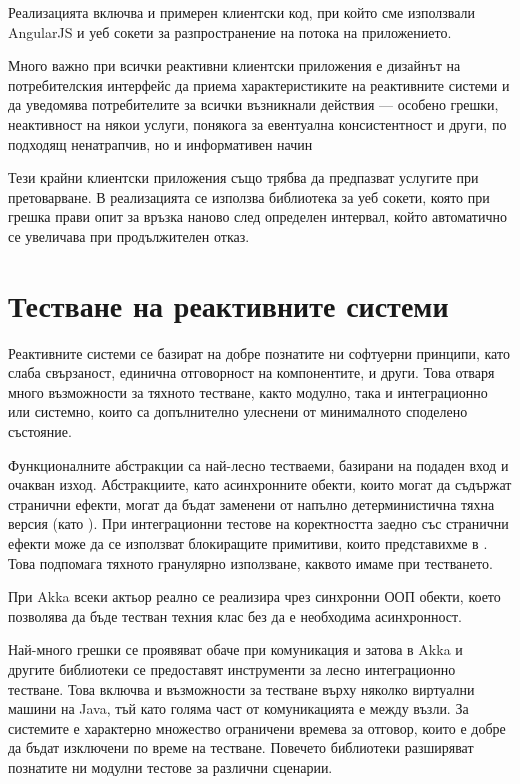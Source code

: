 Реализацията включва и примерен клиентски код, при който сме използвали AngularJS и уеб сокети за разпространение на  потока на приложението.

Много важно при всички реактивни клиентски приложения е дизайнът на потребителския интерфейс да приема характеристиките на реактивните системи и да уведомява потребителите за всички възникнали действия — особено грешки, неактивност на някои услуги, понякога за евентуална консистентност и други, по подходящ ненатрапчив, но и информативен начин

Тези крайни клиентски приложения също трябва да предпазват услугите при претоварване. В реализацията се използва библиотека за уеб сокети, която при грешка прави опит за връзка наново след определен интервал, който автоматично се увеличава при продължителен отказ.

\section{Тестване на реактивните системи}

Реактивните системи се базират на добре познатите ни софтуерни принципи, като слаба свързаност, единична отговорност на компонентите, и други. Това отваря много възможности за тяхното тестване, както модулно, така и интеграционно или системно, които са допълнително улеснени от минималното споделено състояние.

Функционалните абстракции са най-лесно тестваеми, базирани на подаден вход и очакван изход. Абстракциите, като асинхронните  обекти, които могат да съдържат странични ефекти, могат да бъдат заменени от напълно детерминистична тяхна версия (като ). При интеграционни тестове на коректността заедно със странични ефекти може да се използват блокиращите примитиви, които представихме в . Това подпомага тяхното гранулярно използване, каквото имаме при тестването.

При Akka всеки актьор реално се реализира чрез синхронни ООП обекти, което позволява да бъде тестван техния клас без да е необходима асинхронност.

Най-много грешки се проявяват обаче при комуникация и затова в Akka и другите библиотеки се предоставят инструменти за лесно интеграционно тестване. Това включва и възможности за тестване върху няколко виртуални машини на Java, тъй като голяма част от комуникацията е между възли. За системите е характерно множество ограничени времева за отговор, които е добре да бъдат изключени по време на тестване. Повечето библиотеки разширяват познатите ни модулни тестове за различни сценарии.

